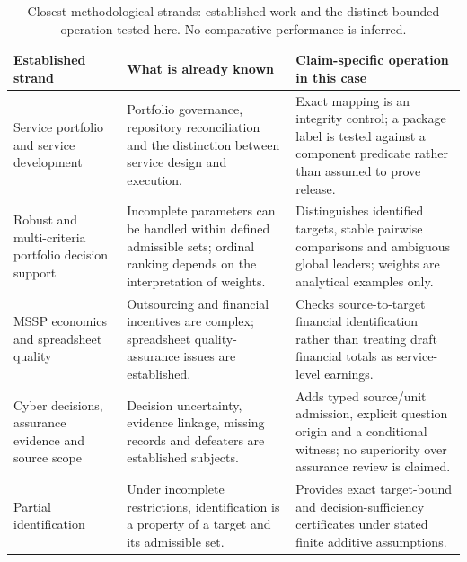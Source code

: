 \documentclass[systems,article,submit,moreauthors]{Definitions/mdpi}
\begin{document}
\begin{table}[H]
\centering\footnotesize
\caption{Closest methodological strands: established work and the distinct bounded operation tested here. No comparative performance is inferred.}
\label{tab:priorwork}
\begin{tabularx}{\linewidth}{>{\raggedright\arraybackslash}p{3.35cm} X X}
\toprule
Established strand & What is already known & Claim-specific operation in this case\\
\midrule
Service portfolio and service development \cite{Kohlborn2009,Comerio2015,BatiniComerio2016,LinHsieh2011,MenorRoth2008} & Portfolio governance, repository reconciliation and the distinction between service design and execution. & Exact mapping is an integrity control; a package label is tested against a component predicate rather than assumed to prove release.\\
Robust and multi-criteria portfolio decision support \cite{Liesio2008,Tavana2019,Maliene2018} & Incomplete parameters can be handled within defined admissible sets; ordinal ranking depends on the interpretation of weights. & Distinguishes identified targets, stable pairwise comparisons and ambiguous global leaders; weights are analytical examples only.\\
MSSP economics and spreadsheet quality \cite{GuptaZhdanov2012,Wu2017,Cezar2017,Powell2008,Poon2024} & Outsourcing and financial incentives are complex; spreadsheet quality-assurance issues are established. & Checks source-to-target financial identification rather than treating draft financial totals as service-level earnings.\\
Cyber decisions, assurance evidence and source scope \cite{Dawson2026,GSNv3,SACM2023,Mohamad2021,MohamadEvidence2024,Viger2026} & Decision uncertainty, evidence linkage, missing records and defeaters are established subjects. & Adds typed source/unit admission, explicit question origin and a conditional witness; no superiority over assurance review is claimed.\\
Partial identification \cite{Manski2005} & Under incomplete restrictions, identification is a property of a target and its admissible set. & Provides exact target-bound and decision-sufficiency certificates under stated finite additive assumptions.\\
\bottomrule
\end{tabularx}
\end{table}
\end{document}
